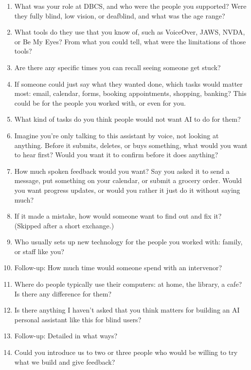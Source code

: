 \documentclass[12pt, titlepage]{article}
\begin{document}
\begin{enumerate}[label=Q\arabic*.]
    \item What was your role at DBCS, and who were the people you supported? Were they fully blind, low vision, or deafblind, and what was the age range?
    \item What tools do they use that you know of, such as VoiceOver, JAWS, NVDA, or Be My Eyes? From what you could tell, what were the limitations of those tools?
    \item Are there any specific times you can recall seeing someone get stuck?
    \item If someone could just say what they wanted done, which tasks would matter most: email, calendar, forms, booking appointments, shopping, banking? This could be for the people you worked with, or even for you.
    \item What kind of tasks do you think people would not want AI to do for them?
    \item Imagine you're only talking to this assistant by voice, not looking at anything. Before it submits, deletes, or buys something, what would you want to hear first? Would you want it to confirm before it does anything?
    \item How much spoken feedback would you want? Say you asked it to send a message, put something on your calendar, or submit a grocery order. Would you want progress updates, or would you rather it just do it without saying much?
    \item If it made a mistake, how would someone want to find out and fix it? (Skipped after a short exchange.)
    \item Who usually sets up new technology for the people you worked with: family, or staff like you?
    \item Follow-up: How much time would someone spend with an intervenor?
    \item Where do people typically use their computers: at home, the library, a cafe? Is there any difference for them?
    \item Is there anything I haven't asked that you think matters for building an AI personal assistant like this for blind users?
    \item Follow-up: Detailed in what ways?
    \item Could you introduce us to two or three people who would be willing to try what we build and give feedback?
\end{enumerate}
\end{document}
